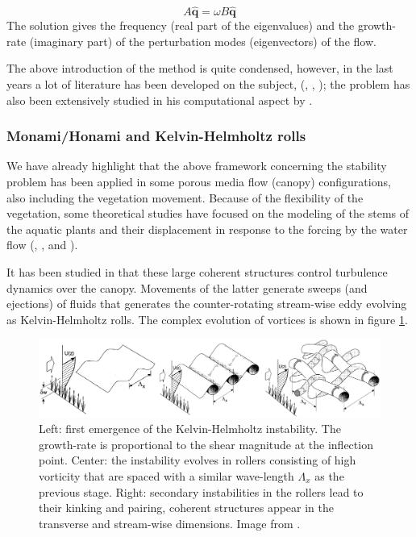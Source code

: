 $$ A \widehat{\mathbf{q}} =  \omega B\widehat{\mathbf{q}} $$
The solution gives the frequency (real part of the eigenvalues) and the growth-rate (imaginary part) of the perturbation modes (eigenvectors) of the flow.

The above introduction of the method is quite condensed, however, in the last years a lot of literature has been developed on the subject, (\citet{juniper2014modal}, \citet{criminale2003theory}, \citet{schmid2012stability}); the problem has also been extensively studied in his computational aspect by \citet{canuto1988spectral}.

\subsubsection{Monami/Honami and Kelvin-Helmholtz rolls}

We have already highlight that the above framework concerning the stability problem has been applied in some porous media flow (canopy) configurations, also including the vegetation movement.
Because of the flexibility of the vegetation, some theoretical studies have focused on the
modeling of the stems of the aquatic plants and their displacement in response to the forcing by the
water flow (\citet{py2004mixing}, \citet{patil2010characteristics}, \citet{gosselin2009destabilising} and \citet{py2006frequency}).

It has been studied in \citet{finnigan2000turbulence} that these large coherent structures control turbulence dynamics over the canopy. 
Movements of the latter generate sweeps (and ejections) of fluids that generates the counter-rotating stream-wise eddy evolving as Kelvin-Helmholtz rolls.
The complex evolution of vortices is shown in figure \ref{fig:monai_evol}.

\begin{figure}[h]
	\centering
	\includegraphics[width=1\linewidth]{chapter_1/finn}
	\caption{Left: first emergence of the Kelvin-Helmholtz instability. The growth-rate is proportional to the shear magnitude at the inflection point. Center: the instability evolves in rollers consisting of high vorticity that are spaced with a similar wave-length $\Lambda_x$ as the previous stage.  Right: secondary instabilities in the rollers lead to their kinking and pairing, coherent structures appear in the transverse and stream-wise dimensions. Image from \citet{finnigan2000turbulence}.}
	\label{fig:monai_evol}
\end{figure}


